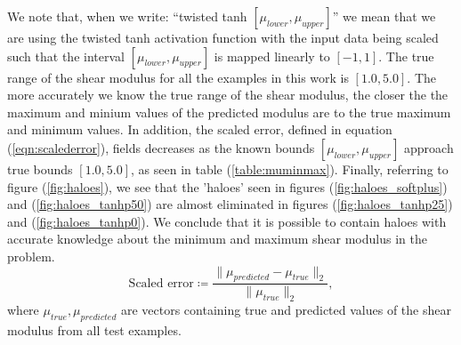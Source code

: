 \documentclass[12pt]{article}
\newcommand{\beq}{\begin{equation}}
\newcommand{\eeq}{\end{equation}}
\begin{document}
We note that, when we write: ``twisted tanh $[\mu_{lower},\mu_{upper}]$'' we mean that we are using the twisted tanh activation function with the input data being scaled such that the interval $[\mu_{lower},\mu_{upper}]$ is mapped linearly to $[-1,1]$. The true range of the shear modulus for all the examples in this work is $[1.0,5.0]$. The more accurately we know the true range of the shear modulus, the closer the the maximum and minium values of the predicted modulus are to the true maximum and minimum values. In addition, the scaled error, defined in equation (\ref{eqn:scalederror}), fields decreases as the known bounds $[\mu_{lower},\mu_{upper}]$ approach true bounds $[1.0,5.0]$, as seen in table (\ref{table:muminmax}). Finally, referring to figure (\ref{fig:haloes}), we see that the 'haloes' seen in figures (\ref{fig:haloes_softplus}) and (\ref{fig:haloes_tanhp50}) are almost eliminated in figures (\ref{fig:haloes_tanhp25}) and (\ref{fig:haloes_tanhp0}). We conclude that it is possible to contain haloes with accurate knowledge about the minimum and maximum shear modulus in the problem.
\begin{subequations}
  \beq
  \text{Scaled error}\coloneqq \frac{\|\mu_{predicted} - \mu_{true}\|_{2}}{\|\mu_{true}\|_{2}}   \label{eqn:scalederror},
\eeq
\end{subequations}
where $\mu_{true},\mu_{predicted}$ are vectors containing true and predicted values of the shear modulus from all test examples.
\end{document}
